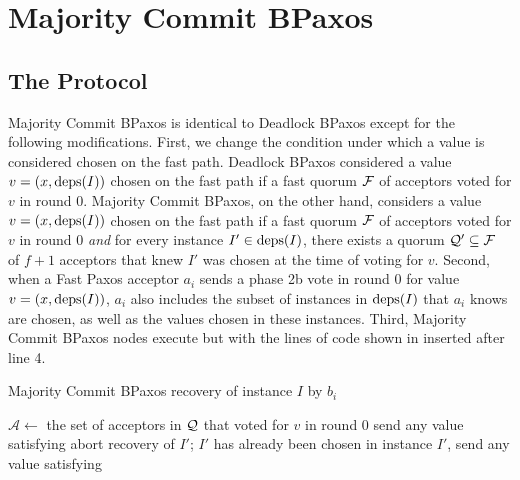 \section{Majority Commit BPaxos}
\subsection{The Protocol}
Majority Commit BPaxos is identical to Deadlock BPaxos except for the following
modifications.
%
First, we change the condition under which a value is considered chosen on the
fast path.  Deadlock BPaxos considered a value $v = (x, \text{deps}(I))$ chosen on
the fast path if a fast quorum $\mathcal{F}$ of acceptors voted for $v$ in
round $0$.  Majority Commit BPaxos, on the other hand, considers a value $v =
(x, \text{deps}(I))$ chosen on the fast path if a fast quorum $\mathcal{F}$ of
acceptors voted for $v$ in round $0$ \emph{and} for every instance $I' \in
\text{deps}(I)$, there exists a quorum $\mathcal{Q}' \subseteq \mathcal{F}$ of $f + 1$
acceptors that knew $I'$ was chosen at the time of voting for $v$.
%
Second, when a Fast Paxos acceptor $a_i$ sends a phase 2b vote in round $0$ for
value $v = (x, \text{deps}(I))$, $a_i$ also includes the subset of instances in
$\text{deps}(I)$ that $a_i$ knows are chosen, as well as the values chosen in these
instances.
%
Third, Majority Commit BPaxos nodes execute  but with
the lines of code shown in  inserted after line
4.

\begin{algorithm}[ht]
  \caption{Majority Commit BPaxos recovery of instance $I$ by $b_i$}%
  \begin{algorithmic}[1]
    \makeatletter
    \setcounter{ALG@line}{4}
    \makeatother
    \State $\mathcal{A} \gets$ the set of acceptors in $\mathcal{Q}$ that voted for
           $v$ in round $0$
      \State send any value satisfying 
    \EndIf{}
        \State abort recovery of $I'$; $I'$ has already been chosen
      \Else{}
        \State in instance $I'$, send any value satisfying
      \EndIf{}
    \EndIf{}
  \end{algorithmic}
\end{algorithm}

